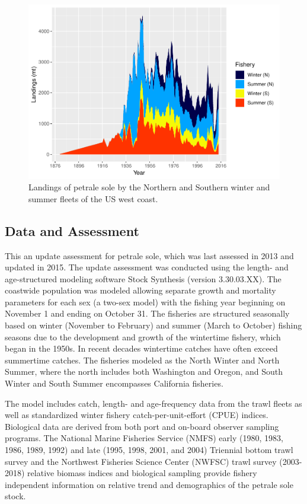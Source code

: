 \documentclass[12pt,]{article}
\begin{document}
\FloatBarrier

\begin{figure}
\centering
\includegraphics{Petrale_2019_Update_files/figure-latex/unnamed-chunk-13-1.pdf}
\caption{Landings of petrale sole by the Northern and Southern winter
and summer fleets of the US west coast. \label{fig:Exec_catch1}}
\end{figure}

\FloatBarrier

\subsection*{Data and Assessment}\label{data-and-assessment}

This an update assessment for petrale sole, which was last assessed in
2013 and updated in 2015. The update assessment was conducted using the
length- and age-structured modeling software Stock Synthesis (version
3.30.03.XX). The coastwide population was modeled allowing separate
growth and mortality parameters for each sex (a two-sex model) with the
fishing year beginning on November 1 and ending on October 31. The
fisheries are structured seasonally based on winter (November to
February) and summer (March to October) fishing seasons due to the
development and growth of the wintertime fishery, which began in the
1950s. In recent decades wintertime catches have often exceed summertime
catches. The fisheries modeled as the North Winter and North Summer,
where the north includes both Washington and Oregon, and South Winter
and South Summer encompasses California fisheries.

The model includes catch, length- and age-frequency data from the trawl
fleets as well as standardized winter fishery catch-per-unit-effort
(CPUE) indices. Biological data are derived from both port and on-board
observer sampling programs. The National Marine Fisheries Service (NMFS)
early (1980, 1983, 1986, 1989, 1992) and late (1995, 1998, 2001, and
2004) Triennial bottom trawl survey and the Northwest Fisheries Science
Center (NWFSC) trawl survey (2003-2018) relative biomass indices and
biological sampling provide fishery independent information on relative
trend and demographics of the petrale sole stock.
\end{document}
